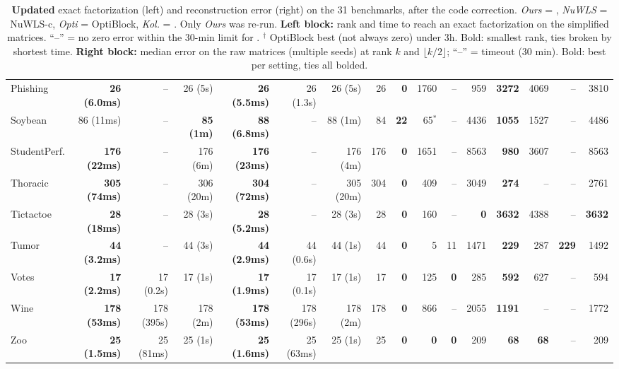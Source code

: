 \begin{table}[h]
\begin{tabular}{l rrr rrr r rrrr rrrr}
Phishing & \textbf{26 (6.0ms)} & -- & 26 (5s) & \textbf{26 (5.5ms)} & 26 (1.3s) & 26 (5s) & 26 & \textbf{0} & 1760 & -- & 959 & \textbf{3272} & 4069 & -- & 3810 \\
Soybean & 86 (11ms) & -- & \textbf{85 (1m)} & \textbf{88 (6.8ms)} & -- & 88 (1m) & 84 & \textbf{22} & 65$^{\ast}$ & -- & 4436 & \textbf{1055} & 1527 & -- & 4486 \\
StudentPerf. & \textbf{176 (22ms)} & -- & 176 (6m) & \textbf{176 (23ms)} & -- & 176 (4m) & 176 & \textbf{0} & 1651 & -- & 8563 & \textbf{980} & 3607 & -- & 8563 \\
Thoracic & \textbf{305 (74ms)} & -- & 306 (20m) & \textbf{304 (72ms)} & -- & 305 (20m) & 304 & \textbf{0} & 409 & -- & 3049 & \textbf{274} & -- & -- & 2761 \\
Tictactoe & \textbf{28 (18ms)} & -- & 28 (3s) & \textbf{28 (5.2ms)} & -- & 28 (3s) & 28 & \textbf{0} & 160 & -- & \textbf{0} & \textbf{3632} & 4388 & -- & \textbf{3632} \\
Tumor & \textbf{44 (3.2ms)} & -- & 44 (3s) & \textbf{44 (2.9ms)} & 44 (0.6s) & 44 (1s) & 44 & \textbf{0} & 5 & 11 & 1471 & \textbf{229} & 287 & \textbf{229} & 1492 \\
Votes & \textbf{17 (2.2ms)} & 17 (0.2s) & 17 (1s) & \textbf{17 (1.9ms)} & 17 (0.1s) & 17 (1s) & 17 & \textbf{0} & 125 & \textbf{0} & 285 & \textbf{592} & 627 & -- & 594 \\
Wine & \textbf{178 (53ms)} & 178 (395s) & 178 (2m) & \textbf{178 (53ms)} & 178 (296s) & 178 (2m) & 178 & \textbf{0} & 866 & -- & 2055 & \textbf{1191} & -- & -- & 1772 \\
Zoo & \textbf{25 (1.5ms)} & 25 (81ms) & 25 (1s) & \textbf{25 (1.6ms)} & 25 (63ms) & 25 (1s) & 25 & \textbf{0} & \textbf{0} & \textbf{0} & 209 & \textbf{68} & \textbf{68} & -- & 209 \\
\bottomrule
\end{tabular}
\caption{\textbf{Updated} exact factorization (left) and reconstruction error (right) on the 31 benchmarks, after the code correction. \emph{Ours} = \ourmethod{}, \emph{NuWLS} = NuWLS-c, \emph{Opti} = OptiBlock, \emph{Kol.} = \citet{kolomvakis2025algorithms}. Only \emph{Ours} was re-run.
\textbf{Left block:} rank and time to reach an exact factorization on the simplified matrices. ``--'' = no zero error within the 30-min limit for \ourmethod{}. ${}^{\dagger}$ OptiBlock best (not always zero) under 3h. Bold: smallest rank, ties broken by shortest time.
\textbf{Right block:} median error on the raw matrices (multiple seeds) at rank $k$ and $\lfloor k/2 \rfloor$; ``--'' = timeout (30 min). Bold: best per setting, ties all bolded.}
\label{tab:main-updated}
\end{table}
